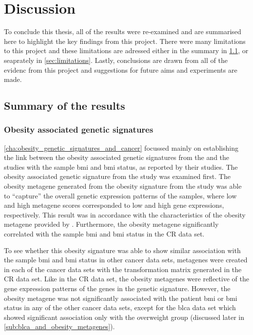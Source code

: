 \chapter{Discussion}
\label{cha:discussion}

To conclude this thesis, all of the results were re-examined and are summarised here to highlight the key findings from this project.
There were many limitations to this project and these limitations are adressed either in the summary in \cref{sec:summary_of_the_results}, or seaprately in \cref{sec:limitations}.
Lastly, conclusions are drawn from all of the evidenc from this project and suggestions for future aims and experiments are made.


\section{Summary of the results}
\label{sec:summary_of_the_results}

\subsection{Obesity associated genetic signatures}
\label{sub:obesity_associated_genetic_signatures}

\cref{cha:obesity_genetic_signatures_and_cancer} focussed mainly on establishing the link between the obesity associated genetic signatures from the \citet{Creighton2012} and the \citet{Fuentes-Mattei2014} studies with the sample \gls{bmi} and \gls{bmi} status, as reported by their studies.
The obesity associated genetic signature from the \citet{Creighton2012} study was examined first.
The obesity metagene generated from the obesity signature from the \citet{Creighton2012} study was able to ``capture'' the overall genetic expression patterns of the samples, where low and high metagene scores  corresponded to low and high gene expressions, respectively.
This result was in accordance with the characteristics of the obesity metagene provided by \citet{Creighton2012}.
Furthermore, the obesity metagene significantly correlated with the sample \gls{bmi} and \gls{bmi} status in the CR data set.

To see whether this obesity signature was able to show similar association with the sample \gls{bmi} and \gls{bmi} status in other cancer data sets, metagenes were created in each of the cancer data sets with the transformation matrix generated in the CR  data set.
Like in the CR  data set, the obesity metagenes were reflective of the gene expression patterns of the genes in the genetic signature.
However, the obesity metagene was not significantly associated with the patient \gls{bmi} or \gls{bmi} status in any of the other cancer data sets, except for  the \gls{blca} data set which showed significant association only with the overweight group (discussed later in \cref{sub:blca_and_obesity_metagenes}).

